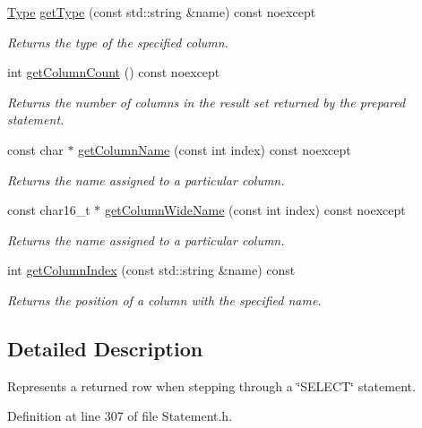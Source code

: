 \begin{DoxyCompactItemize}
\hyperlink{a00038_ad7a8ff5f375eca25eb6e3a51d746a04c}{Type} \hyperlink{a00010_ae4f049a45c69b9e1bf6db4cf63699f64}{get\-Type} (const std\-::string \&name) const noexcept
\begin{DoxyCompactList}\small\item\em Returns the type of the specified column. \end{DoxyCompactList}\item 
int \hyperlink{a00010_a9e6b9d0d99dea8964a34a3c2f08e99bc}{get\-Column\-Count} () const noexcept
\begin{DoxyCompactList}\small\item\em Returns the number of columns in the result set returned by the prepared statement. \end{DoxyCompactList}\item 
const char $\ast$ \hyperlink{a00010_a5004961d65336631d45de411ffb87cd5}{get\-Column\-Name} (const int index) const noexcept
\begin{DoxyCompactList}\small\item\em Returns the name assigned to a particular column. \end{DoxyCompactList}\item 
const char16\-\_\-t $\ast$ \hyperlink{a00010_af46d30137ad020b1e22ad703810ea002}{get\-Column\-Wide\-Name} (const int index) const noexcept
\begin{DoxyCompactList}\small\item\em Returns the name assigned to a particular column. \end{DoxyCompactList}\item 
int \hyperlink{a00010_ae7eaa050a97cda893e9737bca416f0cb}{get\-Column\-Index} (const std\-::string \&name) const
\begin{DoxyCompactList}\small\item\em Returns the position of a column with the specified name. \end{DoxyCompactList}\end{DoxyCompactItemize}


\subsection{Detailed Description}
Represents a returned row when stepping through a \char`\"{}\-S\-E\-L\-E\-C\-T\char`\"{} statement. 

Definition at line 307 of file Statement.\-h.



